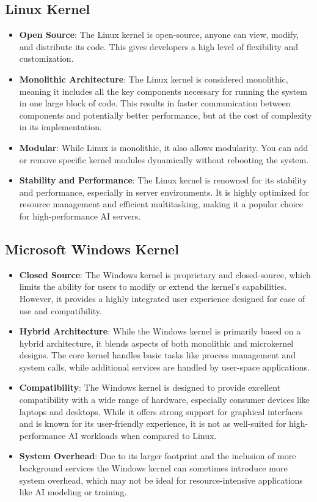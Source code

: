 \subsection{Linux Kernel}
\begin{itemize}
    \item \textbf{Open Source}: The Linux kernel is open-source, anyone can view, modify, and distribute its code. This gives developers a high level of flexibility and customization.
    \item \textbf{Monolithic Architecture}: The Linux kernel is considered monolithic, meaning it includes all the key components necessary for running the system in one large block of code. This results in faster communication between components and potentially better performance, but at the cost of complexity in its implementation.
    \item \textbf{Modular}: While Linux is monolithic, it also allows modularity. You can add or remove specific kernel modules dynamically without rebooting the system.
    \item \textbf{Stability and Performance}: The Linux kernel is renowned for its stability and performance, especially in server environments. It is highly optimized for resource management and efficient multitasking, making it a popular choice for high-performance AI servers.
\end{itemize}

\subsection{Microsoft Windows Kernel}
\begin{itemize}
    \item \textbf{Closed Source}: The Windows kernel is proprietary and closed-source, which limits the ability for users to modify or extend the kernel's capabilities. However, it provides a highly integrated user experience designed for ease of use and compatibility.
    \item \textbf{Hybrid Architecture}: While the Windows kernel is primarily based on a hybrid architecture, it blends aspects of both monolithic and microkernel designs. The core kernel handles basic tasks like process management and system calls, while additional services are handled by user-space applications.
    \item \textbf{Compatibility}: The Windows kernel is designed to provide excellent compatibility with a wide range of hardware, especially consumer devices like laptops and desktops. While it offers strong support for graphical interfaces and is known for its user-friendly experience, it is not as well-suited for high-performance AI workloads when compared to Linux.
    \item \textbf{System Overhead}: Due to its larger footprint and the inclusion of more background services the Windows kernel can sometimes introduce more system overhead, which may not be ideal for resource-intensive applications like AI modeling or training.
\end{itemize}

